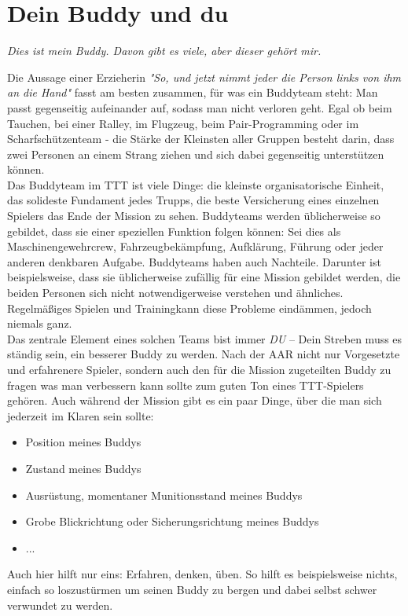 \pagebreak
\section{Dein Buddy und du}
\centerline{\textit{Dies ist mein Buddy. Davon gibt es viele, aber dieser gehört mir.}}
	Die Aussage einer Erzieherin \textit{"So, und jetzt nimmt jeder die Person links von ihm an die Hand"} fasst am besten zusammen, für was ein Buddyteam steht: Man passt gegenseitig aufeinander auf, sodass man nicht verloren geht. Egal ob beim Tauchen, bei einer Ralley, im Flugzeug, beim Pair-Programming oder im Scharfschützenteam - die Stärke der Kleinsten aller Gruppen besteht darin, dass zwei Personen an einem Strang ziehen und sich dabei gegenseitig unterstützen können. \\
	Das Buddyteam im \ac{TTT} ist viele Dinge: die kleinste organisatorische Einheit, das solideste Fundament jedes Trupps, die beste Versicherung eines einzelnen Spielers das Ende der Mission zu sehen. Buddyteams werden üblicherweise so gebildet, dass sie einer speziellen Funktion folgen können: Sei dies als Maschinengewehrcrew, Fahrzeugbekämpfung, Aufklärung, Führung oder jeder anderen denkbaren Aufgabe. Buddyteams haben auch Nachteile. Darunter ist beispielsweise, dass sie üblicherweise zufällig für eine Mission gebildet werden, die beiden Personen sich nicht notwendigerweise verstehen und ähnliches. Regelmäßiges Spielen und Trainingkann diese Probleme eindämmen, jedoch niemals ganz. \\
	Das zentrale Element eines solchen Teams bist immer \textit{DU} -- Dein Streben muss es ständig sein, ein besserer Buddy zu werden. Nach der AAR nicht nur Vorgesetzte und erfahrenere Spieler, sondern auch den für die Mission zugeteilten Buddy zu fragen was man verbessern kann sollte zum guten Ton eines \ac{TTT}-Spielers gehören. Auch während der Mission gibt es ein paar Dinge, über die man sich jederzeit im Klaren sein sollte:
		\begin{itemize}
			\item Position meines Buddys
			\item Zustand meines Buddys
			\item Ausrüstung, momentaner Munitionsstand meines Buddys
			\item Grobe Blickrichtung oder Sicherungsrichtung meines Buddys
			\item ...
		\end{itemize}
	Auch hier hilft nur eins: Erfahren, denken, üben. So hilft es beispielsweise nichts, einfach so loszustürmen um seinen Buddy zu bergen und dabei selbst schwer verwundet zu werden. 